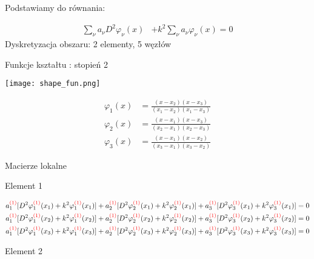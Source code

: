 \documentclass[9pt, a4paper]{article}
\begin{document}
Podstawiamy do równania: 

\begin{align*}
\sum_\nu a_\nu D^2\varphi_\nu(x)&+k^2\sum_\nu a_\nu\varphi_\nu(x)=0
\end{align*}
\clearpage
Dyskretyzacja obszaru: 2 elementy, 5 węzłów

Funkcje kształtu : stopień 2

\begin{center}
\texttt{[image: shape\_fun.png]}
\end{center}

\begin{align*}
\varphi_1(x)&=\frac{(x-x_2)(x-x_3)}{(x_1-x_2)(x_1-x_3)}\\
\varphi_2(x)&=\frac{(x-x_1)(x-x_3)}{(x_2-x_1)(x_2-x_3)}\\
\varphi_3(x)&=\frac{(x-x_1)(x-x_2)}{(x_3-x_1)(x_3-x_2)}
\end{align*}

Macierze lokalne

Element 1

\begin{align*}
a_1^{\textcolor{red}{(1)}}[D^2\varphi_1^{\textcolor{red}{(1)}}(x_1)+k^2\varphi_1^{\textcolor{red}{(1)}}(x_1)]+a_2^{\textcolor{red}{(1)}}[D^2\varphi_2^{\textcolor{red}{(1)}}(x_1)+k^2\varphi_2^{\textcolor{red}{(1)}}(x_1)]+a_3^{\textcolor{red}{(1)}}[D^2\varphi_3^{\textcolor{red}{(1)}}(x_1)+k^2\varphi_3^{\textcolor{red}{(1)}}(x_1)]=0\\
a_1^{\textcolor{red}{(1)}}[D^2\varphi_1^{\textcolor{red}{(1)}}(x_2)+k^2\varphi_1^{\textcolor{red}{(1)}}(x_2)]+a_2^{\textcolor{red}{(1)}}[D^2\varphi_2^{\textcolor{red}{(1)}}(x_2)+k^2\varphi_2^{\textcolor{red}{(1)}}(x_2)]+a_3^{\textcolor{red}{(1)}}[D^2\varphi_3^{\textcolor{red}{(1)}}(x_2)+k^2\varphi_3^{\textcolor{red}{(1)}}(x_2)]=0\\
a_1^{\textcolor{red}{(1)}}[D^2\varphi_1^{\textcolor{red}{(1)}}(x_3)+k^2\varphi_1^{\textcolor{red}{(1)}}(x_3)]+a_2^{\textcolor{red}{(1)}}[D^2\varphi_2^{\textcolor{red}{(1)}}(x_3)+k^2\varphi_2^{\textcolor{red}{(1)}}(x_3)]+a_3^{\textcolor{red}{(1)}}[D^2\varphi_3^{\textcolor{red}{(1)}}(x_3)+k^2\varphi_3^{\textcolor{red}{(1)}}(x_3)]=0
\end{align*}

Element 2
\end{document}
